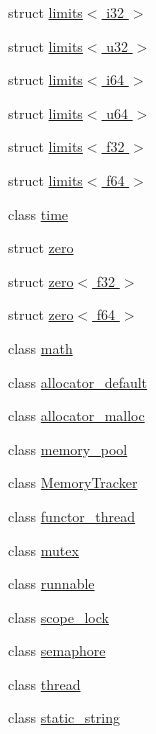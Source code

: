 \begin{DoxyCompactItemize}
struct \hyperlink{structcrap_1_1limits_3_01i32_01_4}{limits$<$ i32 $>$}
\item 
struct \hyperlink{structcrap_1_1limits_3_01u32_01_4}{limits$<$ u32 $>$}
\item 
struct \hyperlink{structcrap_1_1limits_3_01i64_01_4}{limits$<$ i64 $>$}
\item 
struct \hyperlink{structcrap_1_1limits_3_01u64_01_4}{limits$<$ u64 $>$}
\item 
struct \hyperlink{structcrap_1_1limits_3_01f32_01_4}{limits$<$ f32 $>$}
\item 
struct \hyperlink{structcrap_1_1limits_3_01f64_01_4}{limits$<$ f64 $>$}
\item 
class \hyperlink{classcrap_1_1time}{time}
\item 
struct \hyperlink{structcrap_1_1zero}{zero}
\item 
struct \hyperlink{structcrap_1_1zero_3_01f32_01_4}{zero$<$ f32 $>$}
\item 
struct \hyperlink{structcrap_1_1zero_3_01f64_01_4}{zero$<$ f64 $>$}
\item 
class \hyperlink{classcrap_1_1math}{math}
\item 
class \hyperlink{classcrap_1_1allocator__default}{allocator\-\_\-default}
\item 
class \hyperlink{classcrap_1_1allocator__malloc}{allocator\-\_\-malloc}
\item 
class \hyperlink{classcrap_1_1memory__pool}{memory\-\_\-pool}
\item 
class \hyperlink{classcrap_1_1_memory_tracker}{Memory\-Tracker}
\item 
class \hyperlink{classcrap_1_1functor__thread}{functor\-\_\-thread}
\item 
class \hyperlink{classcrap_1_1mutex}{mutex}
\item 
class \hyperlink{classcrap_1_1runnable}{runnable}
\item 
class \hyperlink{classcrap_1_1scope__lock}{scope\-\_\-lock}
\item 
class \hyperlink{classcrap_1_1semaphore}{semaphore}
\item 
class \hyperlink{classcrap_1_1thread}{thread}
\item 
class \hyperlink{classcrap_1_1static__string}{static\-\_\-string}
\end{DoxyCompactItemize}
